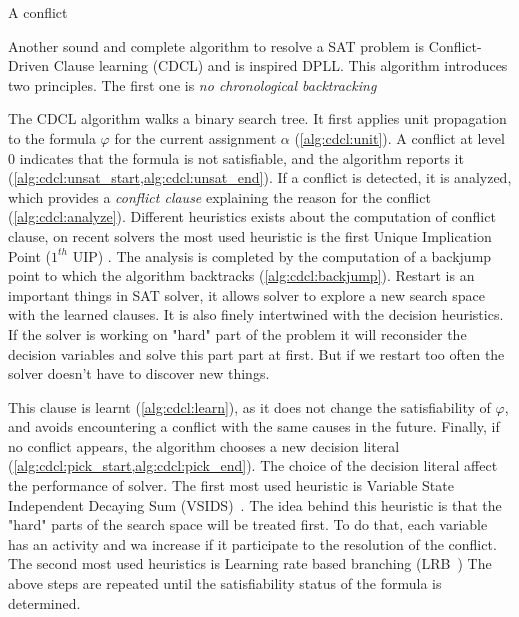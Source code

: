 A conflict 



Another sound and complete algorithm to resolve a SAT problem is 
Conflict-Driven Clause learning (CDCL)  and is inspired DPLL.
This algorithm introduces two principles. The first one is \emph{no chronological backtracking}



The CDCL algorithm walks a binary search tree.  It first applies unit propagation to
the formula $\varphi$ for the current assignment $\alpha$ (\cref{alg:cdcl:unit}).
A conflict at level $0$ indicates that the formula is not satisfiable, and the algorithm
reports it (\cref{alg:cdcl:unsat_start,alg:cdcl:unsat_end}).
If a conflict is detected, it is analyzed, which provides a \emph{conflict clause} 
explaining the reason for the conflict (\cref{alg:cdcl:analyze}).
Different heuristics exists about the computation of conflict clause, on recent solvers
the most used heuristic is the first Unique Implication Point ($1^{th}$ UIP) \cite{zhang2001efficient}.
The analysis is completed by the computation of a
backjump point to which the algorithm backtracks (\cref{alg:cdcl:backjump}).
Restart is an important things in SAT solver, it allows solver to explore a new search space
with the learned clauses. It is also finely intertwined with the decision heuristics.
If the solver is working on "hard" part of the problem it will reconsider the decision variables and
solve this part part at first. But if we restart too often the solver doesn't have to discover new things.

  This clause is learnt (\cref{alg:cdcl:learn}), as it does not change the
satisfiability of $\varphi$, and avoids encountering a conflict with the same
causes in the future.
Finally, if no conflict appears, the algorithm chooses a new decision literal 
(\cref{alg:cdcl:pick_start,alg:cdcl:pick_end}). The choice of the decision literal
affect the performance of solver. The first most used heuristic is Variable State Independent Decaying Sum (VSIDS)~\cite{moskewicz2001chaff}. The idea behind this heuristic is that the "hard" parts of the search space 
will be treated first. To do that, each variable has an activity and wa increase if it participate to the resolution
of the conflict.
The second most used heuristics is Learning rate based branching (LRB~\cite{liang2016learning})
The above steps are repeated until the satisfiability status of the formula is determined.





